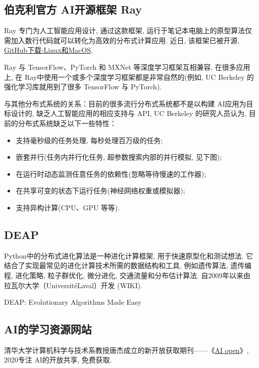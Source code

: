 \subsection{伯克利官方 AI开源框架 Ray}
Ray 专门为人工智能应用设计, 通过这款框架, 运行于笔记本电脑上的原型算法仅需加入数行代码就可以转化为高效的分布式计算应用. 近日, 该框架已被开源, \href{https://github.com/ray-project/ray}{GitHub下载-Linux和MacOS}.

Ray 与 TensorFlow、PyTorch 和 MXNet 等深度学习框架互相兼容, 在很多应用上, 在 Ray中使用一个或多个深度学习框架都是非常自然的(例如, UC Berkeley 的强化学习库就用到了很多 TensorFlow 与 PyTorch).

与其他分布式系统的关系：目前的很多流行分布式系统都不是以构建 AI应用为目标设计的, 缺乏人工智能应用的相应支持与 API, UC Berkeley 的研究人员认为, 目前的分布式系统缺乏以下一些特性：

\begin{itemize}
\item 支持毫秒级的任务处理, 每秒处理百万级的任务;
\item 嵌套并行(任务内并行化任务, 超参数搜索内部的并行模拟, 见下图);
\item 在运行时动态监测任意任务的依赖性(忽略等待慢速的工作器);
\item 在共享可变的状态下运行任务(神经网络权重或模拟器);
\item 支持异构计算(CPU、GPU 等等).
\end{itemize}
\subsection{DEAP}

Python中的分布式进化算法是一种进化计算框架, 用于快速原型化和测试想法. 它结合了实现最常见的进化计算技术所需的数据结构和工具, 例如遗传算法, 遗传编程, 进化策略, 粒子群优化, 微分进化, 交通流量和分布估计算法. 自2009年以来由拉瓦尔大学（UniversitéLaval）开发 (WIKI).

{DEAP}: Evolutionary Algorithms Made Easy \cite{DEAPJMLR2012}
\subsection{AI的学习资源网站}
清华大学计算机科学与技术系教授唐杰成立的新开放获取期刊——《\href{https://www.aiopens.net/main/index.html}{AI open}》, 2020专注 AI的开放共享, 免费获取.

